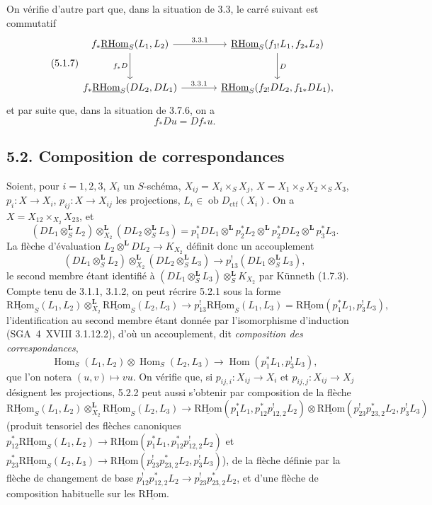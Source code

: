 \documentclass[11pt]{article}
\DeclareMathOperator{\Hom}{Hom}
\newcommand{\R}{\mathrm{R}}\newcommand{\RHomCore}{\mathrm{RHom}}
\providecommand{\RHom}{\RHomCore}
\providecommand{\uRHom}{\underline{\RHom}}
\providecommand{\RHom}{\RHomCore}
\providecommand{\Hom}{\operatorname{Hom}}
\providecommand{\RHom}{\R\mathcal{H}om}
\providecommand{\R}{\mathrm R}
\providecommand{\RHom}{\RHomCore}
\providecommand{\Hom}{\operatorname{Hom}}
\begin{document}
On vérifie d'autre part que, dans la situation de 3.3, le carré suivant est commutatif
\begin{equation}
\tag{5.1.7}
\begin{tikzcd}[column sep=large,row sep=large]
f_*\uRHom_S(L_1,L_2) \arrow[r,"3.3.1"] \arrow[d,"f_*D"']
& \uRHom_S(f_{1!}L_1,f_{2*}L_2) \arrow[d,"D"] \\
f_*\uRHom_S(DL_2,DL_1) \arrow[r,"3.3.1"]
& \uRHom_S(f_{2!}DL_2,f_{1*}DL_1),
\end{tikzcd}
\end{equation}
et par suite que, dans la situation de 3.7.6, on a
\begin{equation}
\tag{5.1.8}
f_*Du=Df_*u.
\end{equation}

\subsection*{5.2. Composition de correspondances}

Soient, pour $i=1,2,3$, $X_i$ un $S$-schéma, $X_{ij}=X_i\times_SX_j$, $X=X_1\times_SX_2\times_SX_3$, $p_i:X\to X_i$, $p_{ij}:X\to X_{ij}$ les projections, $L_i\in\operatorname{ob}D_{\mathrm{ctf}}(X_i)$. On a $X=X_{12}\times_{X_2}X_{23}$, et
\[
(DL_1\otimes_S^{\mathbf L}L_2)\otimes_{X_2}^{\mathbf L}(DL_2\otimes_S^{\mathbf L}L_3)
=p_1^*DL_1\otimes^{\mathbf L}p_2^*L_2\otimes^{\mathbf L}p_2^*DL_2\otimes^{\mathbf L}p_3^*L_3.
\]
La flèche d'évaluation $L_2\otimes^{\mathbf L}DL_2\to K_{X_2}$ définit donc un accouplement
\begin{equation}
\tag{5.2.1}
(DL_1\otimes_S^{\mathbf L}L_2)\otimes_{X_2}^{\mathbf L}(DL_2\otimes_S^{\mathbf L}L_3)\longrightarrow p_{13}^!(DL_1\otimes_S^{\mathbf L}L_3),
\end{equation}
le second membre étant identifié à $(DL_1\otimes_S^{\mathbf L}L_3)\otimes_S^{\mathbf L}K_{X_2}$ par Künneth (1.7.3). Compte tenu de 3.1.1, 3.1.2, on peut récrire 5.2.1 sous la forme
\begin{equation}
\tag{5.2.2}
\uRHom_S(L_1,L_2)\otimes_{X_2}^{\mathbf L}\uRHom_S(L_2,L_3)\longrightarrow p_{13}^!\uRHom_S(L_1,L_3)=\uRHom(p_1^*L_1,p_3^!L_3),
\end{equation}
l'identification au second membre étant donnée par l'isomorphisme d'induction (SGA~4~XVIII 3.1.12.2), d'où un accouplement, dit \emph{composition des correspondances},
\begin{equation}
\tag{5.2.3}
\Hom_S(L_1,L_2)\otimes\Hom_S(L_2,L_3)\longrightarrow\Hom(p_1^*L_1,p_3^!L_3),
\end{equation}
que l'on notera $(u,v)\mapsto vu$. On vérifie que, si $p_{ij,i}:X_{ij}\to X_i$ et $p_{ij,j}:X_{ij}\to X_j$ désignent les projections, 5.2.2 peut aussi s'obtenir par composition de la flèche
\[
\uRHom_S(L_1,L_2)\otimes_{X_2}^{\mathbf L}\uRHom_S(L_2,L_3)
\longrightarrow
\uRHom(p_1^*L_1,p_{12}^*p_{12,2}^!L_2)
\otimes
\uRHom(p_{23}^!p_{23,2}^*L_2,p_3^!L_3)
\]
(produit tensoriel des flèches canoniques $p_{12}^*\uRHom_S(L_1,L_2)\to\uRHom(p_1^*L_1,p_{12}^*p_{12,2}^!L_2)$ et $p_{23}^*\uRHom_S(L_2,L_3)\to\uRHom(p_{23}^!p_{23,2}^*L_2,p_3^!L_3)$), de la flèche définie par la flèche de changement de base $p_{12}^!p_{12,2}^*L_2\to p_{23}^!p_{23,2}^*L_2$, et d'une flèche de composition habituelle sur les $\uRHom$.
\end{document}
